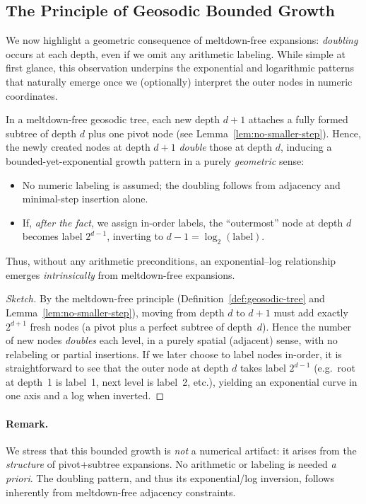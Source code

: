 \subsection{The Principle of Geosodic Bounded Growth}
\label{subsec:bounded-growth}

We now highlight a geometric consequence of meltdown-free expansions:
\emph{doubling} occurs at each depth, even if we omit any arithmetic labeling.
While simple at first glance, this observation underpins the exponential
and logarithmic patterns that naturally emerge once we (optionally) interpret
the outer nodes in numeric coordinates.

\begin{corollary}
\label{cor:geosodic-bounded-growth}
In a meltdown-free geosodic tree, each new depth $d+1$ attaches a fully formed
subtree of depth $d$ plus one pivot node (see Lemma~\ref{lem:no-smaller-step}).
Hence, the newly created nodes at depth $d+1$ \emph{double} those at depth $d$,
inducing a bounded-yet-exponential growth pattern in a purely \emph{geometric} sense:

\begin{itemize}
  \item No numeric labeling is assumed; the doubling follows from adjacency
  and minimal-step insertion alone.
  \item If, \emph{after the fact}, we assign in-order labels, the ``outermost''
  node at depth $d$ becomes label $2^{d-1}$, inverting to $d-1 = \log_2(\text{label})$.
\end{itemize}

Thus, without any arithmetic preconditions, an exponential--log relationship
emerges \emph{intrinsically} from meltdown-free expansions.
\end{corollary}

\begin{proof}[Sketch]
By the meltdown-free principle (Definition~\ref{def:geosodic-tree} and
Lemma~\ref{lem:no-smaller-step}), moving from depth $d$ to $d+1$ must
add exactly $2^{d+1}$ fresh nodes (a pivot plus a perfect subtree of depth~$d$).
Hence the number of new nodes \emph{doubles} each level, in a purely spatial
(adjacent) sense, with no relabeling or partial insertions.
If we later choose to label nodes in-order, it is straightforward
to see that the outer node at depth $d$ takes label $2^{d-1}$ (e.g.\ 
root at depth~1 is label~1, next level is label~2, etc.), yielding an
exponential curve in one axis and a log when inverted.
\end{proof}

\paragraph{Remark.}
We stress that this bounded growth is \emph{not} a numerical artifact:
it arises from the \emph{structure} of pivot+subtree expansions.
No arithmetic or labeling is needed \emph{a priori}. The doubling
pattern, and thus its exponential/log inversion, follows inherently
from meltdown-free adjacency constraints.
